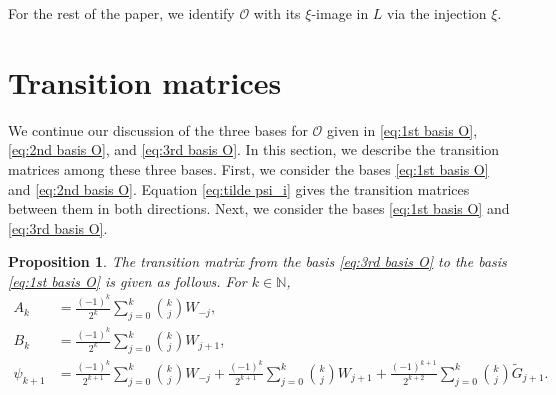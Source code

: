 \documentclass[11pt]{article}%
\theoremstyle{definition}
\theoremstyle{plain}
\newtheorem{proposition}[definition]{Proposition}
\begin{document}
\noindent
For the rest of the paper, we identify $\mathcal{O}$ with its $\xi$-image in $L$ via the injection $\xi$.



\section{Transition matrices}\label{Sec:TM}
We continue our discussion of the three bases for $\mathcal{O}$ given in \eqref{eq:1st basis O}, \eqref{eq:2nd basis O}, and \eqref{eq:3rd basis O}.
In this section, we describe the transition matrices among these three bases.
First, we consider the bases \eqref{eq:1st basis O} and \eqref{eq:2nd basis O}.
Equation \eqref{eq:tilde psi_i} gives the transition matrices between them in both directions.
Next, we consider the bases \eqref{eq:1st basis O} and \eqref{eq:3rd basis O}.


\begin{proposition}\label{lem:tm 3rd 1st}
The transition matrix from the basis \eqref{eq:3rd basis O} to the basis \eqref{eq:1st basis O} is given as follows.
For $k \in \mathbb{N}$,
\begin{align}
	A_k  & = \frac{(-1)^k}{2^k} \sum_{j=0}^k {k \choose j} W_{-j}, \label{eq(1):tm 3rd 1st} \\
	B_k  & = \frac{(-1)^k}{2^k} \sum_{j=0}^k {k \choose j} W_{j+1}, \label{eq(2):tm 3rd 1st} \\
	\psi_{k+1}  
		& = 	\frac{(-1)^k}{2^{k+1}} \sum_{j=0}^k {k \choose j} W_{-j}
			+ \frac{(-1)^k}{2^{k+1}} \sum_{j=0}^k {k \choose j} W_{j+1}
			+ \frac{(-1)^{k+1}}{2^{k+2}} \sum_{j=0}^k {k \choose j} \tilde{G}_{j+1}. \label{eq(3):tm 3rd 1st}
\end{align}
\end{proposition}
\end{document}
